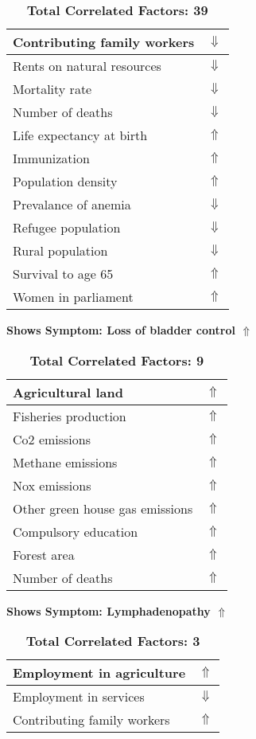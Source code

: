 \documentclass[12pt,notitlepage,oneside]{report}
\begin{document}
\begin{table}[!htb]
\begin{tabular}{|l|l|}
Contributing family workers & $\Downarrow$\\ \hline
Rents on natural resources & $\Downarrow$\\ \hline
Mortality rate & $\Downarrow$\\ \hline
Number of deaths & $\Downarrow$\\ \hline
Life expectancy at birth & $\Uparrow$\\ \hline
Immunization & $\Uparrow$\\ \hline
Population density & $\Uparrow$\\ \hline
Prevalance of anemia & $\Downarrow$\\ \hline
Refugee population & $\Downarrow$\\ \hline
Rural population & $\Downarrow$\\ \hline
Survival to age 65 & $\Uparrow$\\ \hline
Women in parliament & $\Uparrow$\\ \hline
\end{tabular}
\caption*{\textbf{Total Correlated Factors: 39}}
\end{table}
\clearpage
\begin{table}[!htb]
\caption{\textbf{Shows Symptom: Loss of bladder control $\Uparrow$}}
\centering
\label{Correlated Socio-economic Factors0}
\begin{tabular}{|l|l|}
\hline
Agricultural land & $\Uparrow$\\ \hline
Fisheries production & $\Uparrow$\\ \hline
Co2 emissions & $\Uparrow$\\ \hline
Methane emissions & $\Uparrow$\\ \hline
Nox emissions & $\Uparrow$\\ \hline
Other green house gas emissions & $\Uparrow$\\ \hline
Compulsory education & $\Uparrow$\\ \hline
Forest area & $\Uparrow$\\ \hline
Number of deaths & $\Uparrow$\\ \hline
\end{tabular}
\caption*{\textbf{Total Correlated Factors: 9}}
\end{table}
\begin{table}[!htb]
\caption{\textbf{Shows Symptom: Lymphadenopathy $\Uparrow$}}
\centering
\label{Correlated Socio-economic Factors0}
\begin{tabular}{|l|l|}
\hline
Employment in agriculture & $\Uparrow$\\ \hline
Employment in services & $\Downarrow$\\ \hline
Contributing family workers & $\Uparrow$\\ \hline
\end{tabular}
\caption*{\textbf{Total Correlated Factors: 3}}
\end{table}
\end{document}
